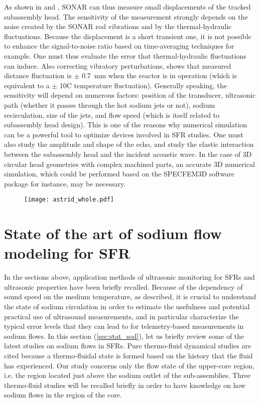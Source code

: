 As shown in \cite{Berton1996Continuousmonitoringof} and \cite{Fontaine2011Descriptionandpreliminary}, SONAR can thus measure small displacements of the tracked subassembly head.
The sensitivity of the measurement strongly depends on the noise created by the SONAR rod vibrations and by the thermal-hydraulic fluctuations.
Because the displacement is a short transient one, it is not possible to enhance the signal-to-noise ratio based on time-averaging techniques for example.
One must thus evaluate the error that thermal-hydraulic fluctuations can induce.
Also correcting vibratory perturbations, \cite{Berton1996Continuousmonitoringof} shows that measured distance fluctuation is
$\pm$ \SI{0.7}{\milli\meter} when the reactor is in operation (which is equivalent to a $\pm$ \num{10}\textdegree{}C temperature fluctuation).
Generally speaking, the sensitivity will depend on numerous factors:
position of the transducer, ultrasonic path (whether it passes through the hot sodium jets or not), sodium recirculation, size of the jets, and flow speed (which is itself
related to subassembly head design).
This is one of the reasons why numerical simulation can be a powerful tool to optimize devices involved in SFR studies.
One must also study the amplitude and shape of the echo, and study the elastic interaction between the subassembly head and the incident acoustic wave.
In the case of 3D circular head geometries with complex machined parts, an accurate 3D numerical simulation,
which could be performed based on the SPECFEM3D software package for instance, may be necessary.

\begin{figure}[htbp]
    \centerline{\texttt{[image: astrid\_whole.pdf]}}
    \label{fig:astrid_whole}
\end{figure}

\section{State of the art of sodium flow modeling for SFR} \label{sec:stat_sod}

    In the sections above, application methods of ultrasonic monitoring for SFRs and ultrasonic properties have been briefly recalled.
Because of the dependency of sound speed on the medium temperature, as described,
it is crucial to understand the state of sodium circulation in order to estimate the usefulness and potential practical use of ultrasound measurements,
and in particular characterize the typical error levels that they can lead to for telemetry-based measurements in sodium flows.
In this section (\autoref{sec:stat_sod}), let us briefly review some of the latest studies on sodium flows in SFRs.
Pure thermo-fluid dynamical studies are cited because a thermo-fluidal
state is formed based on the history that the fluid has experienced. Our study concerns only the flow state of the upper-core region, i.e. the region located just above the
sodium outlet of the sub-assemblies. Three thermo-fluid studies will be recalled briefly in order to have knowledge on how sodium flows in the region of the core.

